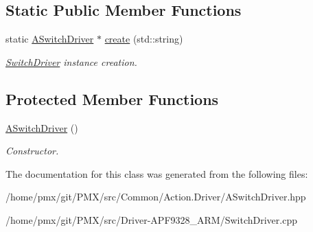 \subsection*{Static Public Member Functions}
\begin{DoxyCompactItemize}
\item 
\mbox{\label{classASwitchDriver_a48667bd3e9828c35b26525bd368e5e57}} 
static \hyperlink{classASwitchDriver}{A\+Switch\+Driver} $\ast$ \hyperlink{classASwitchDriver_a48667bd3e9828c35b26525bd368e5e57}{create} (std\+::string)
\begin{DoxyCompactList}\small\item\em \hyperlink{classSwitchDriver}{Switch\+Driver} instance creation. \end{DoxyCompactList}\end{DoxyCompactItemize}
\subsection*{Protected Member Functions}
\begin{DoxyCompactItemize}
\item 
\mbox{\label{classASwitchDriver_aaf76fcc6d83c47328193a1b614077019}} 
\hyperlink{classASwitchDriver_aaf76fcc6d83c47328193a1b614077019}{A\+Switch\+Driver} ()
\begin{DoxyCompactList}\small\item\em Constructor. \end{DoxyCompactList}\end{DoxyCompactItemize}


The documentation for this class was generated from the following files\+:\begin{DoxyCompactItemize}
\item 
/home/pmx/git/\+P\+M\+X/src/\+Common/\+Action.\+Driver/A\+Switch\+Driver.\+hpp\item 
/home/pmx/git/\+P\+M\+X/src/\+Driver-\/\+A\+P\+F9328\+\_\+\+A\+R\+M/Switch\+Driver.\+cpp\end{DoxyCompactItemize}
